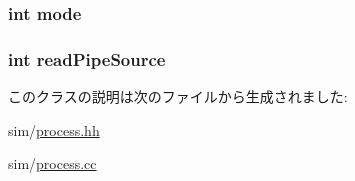 \hypertarget{classProcess_1_1FdMap_a1ea5d0cb93f22f7d0fdf804bd68c3326}{
\subsubsection[{mode}]{\setlength{\rightskip}{0pt plus 5cm}int {\bf mode}}}
\label{classProcess_1_1FdMap_a1ea5d0cb93f22f7d0fdf804bd68c3326}
\hypertarget{classProcess_1_1FdMap_abc824a1a926dd34c7050c0ea4ace0d65}{
\subsubsection[{readPipeSource}]{\setlength{\rightskip}{0pt plus 5cm}int {\bf readPipeSource}}}
\label{classProcess_1_1FdMap_abc824a1a926dd34c7050c0ea4ace0d65}


このクラスの説明は次のファイルから生成されました:\begin{DoxyCompactItemize}
\item 
sim/\hyperlink{sim_2process_8hh}{process.hh}\item 
sim/\hyperlink{sim_2process_8cc}{process.cc}\end{DoxyCompactItemize}
